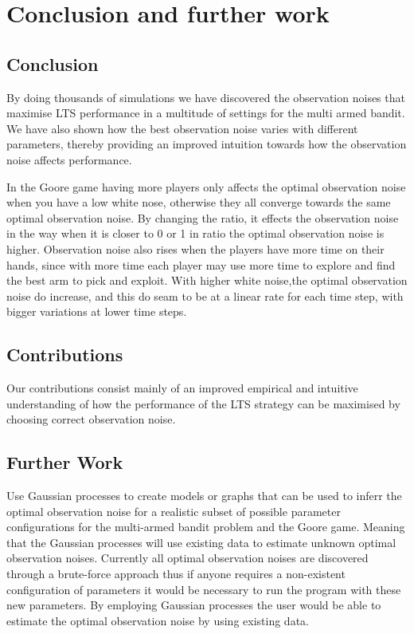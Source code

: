 \chapter{Conclusion and further work}
\label{ch:conclusion}

\section{Conclusion}

By doing thousands of simulations we have discovered the observation noises that maximise LTS performance in a multitude of settings for the multi armed bandit.
We have also shown how the best observation noise varies with different parameters, thereby providing an improved intuition towards how the observation noise affects performance.

In the Goore game having more players only affects the optimal observation noise when you have a low white nose,
otherwise they all converge towards the same optimal observation noise. By changing the ratio, it effects the observation
noise in the way when it is closer to 0 or 1 in ratio the optimal observation noise is higher.
Observation noise also rises when the players have more time on their hands, since with more time each player may use more time 
to explore and find the best arm to pick and exploit. With higher white noise,the optimal observation noise do 
increase, and this do seam to be at a linear rate for each time step, with bigger variations at lower time steps.

\section{Contributions}
Our contributions consist mainly of an improved empirical and intuitive understanding of how the performance of the LTS strategy can be maximised by choosing correct observation noise.


\section{Further Work}
Use Gaussian processes to create models or graphs that can be used to inferr the optimal observation noise for a realistic subset of possible parameter configurations for the multi-armed bandit problem and the Goore game. Meaning that the Gaussian processes will use existing data to estimate unknown optimal observation noises. Currently all optimal observation noises are discovered through a brute-force approach thus if anyone requires a non-existent configuration of parameters it would be necessary to run the program with these new parameters. By employing Gaussian processes the user would be able to estimate the optimal observation noise by using existing data.

